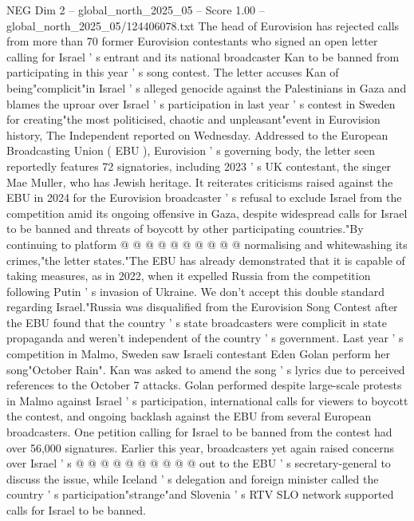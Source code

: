 \begin{textsample}{NEG Dim 2 – global\_north\_2025\_05 – Score 1.00 – global\_north\_2025\_05/124406078.txt}  \label{ex:f2_neg_234}
The head of Eurovision has rejected calls from more than 70 former Eurovision contestants who signed an open letter calling for Israel ' s entrant and its national broadcaster Kan to be banned from participating in this year ' s song contest.
The letter accuses Kan of being"complicit"in Israel ' s alleged genocide against the Palestinians in Gaza and blames the uproar over Israel ' s participation in last year ' s contest in Sweden for creating"the most politicised, chaotic and unpleasant"event in Eurovision history, The Independent reported on Wednesday.
Addressed to the European Broadcasting Union ( EBU ), Eurovision ' s governing body, the letter seen reportedly features 72 signatories, including 2023 ' s UK contestant, the singer Mae Muller, who has Jewish heritage.
It reiterates criticisms raised against the EBU in 2024 for the Eurovision broadcaster ' s refusal to exclude Israel from the competition amid its ongoing offensive in Gaza, despite widespread calls for Israel to be banned and threats of boycott by other participating countries."By continuing to platform @ @ @ @ @ @ @ @ @ @ normalising and whitewashing its crimes,"the letter states."The EBU has already demonstrated that it is capable of taking measures, as in 2022, when it expelled Russia from the competition following Putin ' s invasion of Ukraine.
We don't accept this double standard regarding Israel."Russia was disqualified from the Eurovision Song Contest after the EBU found that the country ' s state broadcasters were complicit in state propaganda and weren't independent of the country ' s government.
Last year ' s competition in Malmo, Sweden saw Israeli contestant Eden Golan perform her song"October Rain".
Kan was asked to amend the song ' s lyrics due to perceived references to the October 7 attacks.
Golan performed despite large-scale protests in Malmo against Israel ' s participation, international calls for viewers to boycott the contest, and ongoing backlash against the EBU from several European broadcasters.
One petition calling for Israel to be banned from the contest had over 56,000 signatures.
Earlier this year, broadcasters yet again raised concerns over Israel ' s @ @ @ @ @ @ @ @ @ @ out to the EBU ' s secretary-general to discuss the issue, while Iceland ' s delegation and foreign minister called the country ' s participation"strange"and Slovenia ' s RTV SLO network supported calls for Israel to be banned.

\end{textsample}
